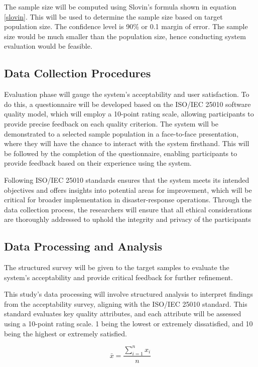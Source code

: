 	The sample size will be computed using Slovin's formula shown in equation \ref{slovin}. This will be used to determine the sample size based on target population size. The confidence level is 90\% or 0.1 margin of error. The sample size would be much smaller than the population size, hence conducting system evaluation  would be feasible.

\subsection{Data Collection Procedures}
	Evaluation phase will gauge the system’s acceptability and user satisfaction. To do this, a questionnaire will be developed based on the ISO/IEC 25010 software quality model, which will employ a 10-point rating scale, allowing participants to provide precise feedback on each quality criterion. The system will be demonstrated to a selected sample population in a face-to-face presentation, where they will have the chance to interact with the system firsthand. This will be followed by the completion of the questionnaire, enabling participants to provide feedback based on their experience using the system.
	
	Following ISO/IEC 25010 standards ensures that the system meets its intended objectives and offers insights into potential areas for improvement, which will be critical for broader implementation in disaster-response operations. Through the data collection process, the researchers will ensure that all ethical considerations are thoroughly addressed to uphold the integrity and privacy of the participants

\subsection{Data Processing and Analysis}
	The structured survey will be given to the target samples to evaluate the system's acceptability and provide critical feedback for further refinement.
	
	This study's data processing will involve structured analysis to interpret findings from the acceptability survey, aligning with the ISO/IEC 25010 standard. This standard evaluates key quality attributes, and each attribute will be assessed using a 10-point rating scale. 1 being the lowest or extremely dissatisfied, and 10 being the highest or extremely satisfied. 
	
	\begin{equation} 
		\label{mean}
		\bar{x} = \frac{\sum_{i=1}^{n} x_{i}}{n}
	\end{equation}
	
